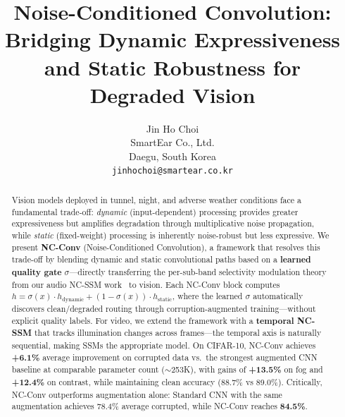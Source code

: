 \documentclass[10pt,twocolumn,letterpaper]{article}
\begin{document}
\title{Noise-Conditioned Convolution: Bridging Dynamic Expressiveness\\and Static Robustness for Degraded Vision}

\author{Jin Ho Choi\\
SmartEar Co., Ltd.\\
Daegu, South Korea\\
{\tt\small jinhochoi@smartear.co.kr}
}

\maketitle

\begin{abstract}
Vision models deployed in tunnel, night, and adverse weather conditions face a fundamental trade-off: \emph{dynamic} (input-dependent) processing provides greater expressiveness but amplifies degradation through multiplicative noise propagation, while \emph{static} (fixed-weight) processing is inherently noise-robust but less expressive.
We present \textbf{NC-Conv} (Noise-Conditioned Convolution), a framework that resolves this trade-off by blending dynamic and static convolutional paths based on a \textbf{learned quality gate} $\sigma$---directly transferring the per-sub-band selectivity modulation theory from our audio NC-SSM work~\cite{choi2026ncssm} to vision.
Each NC-Conv block computes $h = \sigma(x) \cdot h_{\text{dynamic}} + (1{-}\sigma(x)) \cdot h_{\text{static}}$, where the learned $\sigma$ automatically discovers clean/degraded routing through corruption-augmented training---without explicit quality labels.
For video, we extend the framework with a \textbf{temporal NC-SSM} that tracks illumination changes across frames---the temporal axis is naturally sequential, making SSMs the appropriate model.
On CIFAR-10, NC-Conv achieves \textbf{+6.1\%} average improvement on corrupted data vs.\ the strongest augmented CNN baseline at comparable parameter count ($\sim$253K), with gains of \textbf{+13.5\%} on fog and \textbf{+12.4\%} on contrast, while maintaining clean accuracy (88.7\% vs 89.0\%).
Critically, NC-Conv outperforms augmentation alone: Standard CNN with the same augmentation achieves 78.4\% average corrupted, while NC-Conv reaches \textbf{84.5\%}.
\end{abstract}

\end{document}
